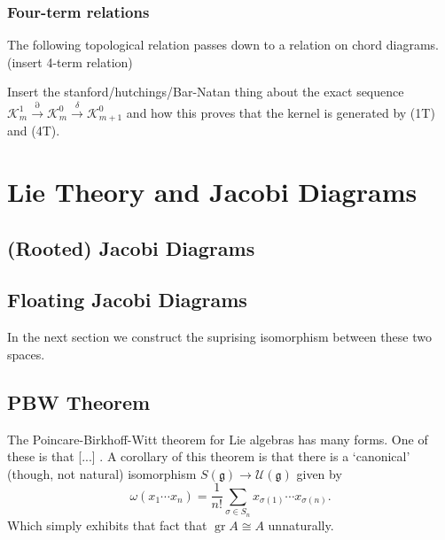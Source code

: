 \documentclass[12pt]{report}
\theoremstyle{regular}
\numberwithin{clause}{chapter}
\newcommand{\scaffold}[1]{
\begin{mdframed}[style=scaffold]
        {\color{teal}#1}
\end{mdframed}
}
\begin{document}
        \subsection{Four-term relations}

        \scaffold{The following topological relation passes down to a relation on chord diagrams. (insert 4-term relation)}

        \scaffold{Insert the stanford/hutchings/Bar-Natan thing about the exact sequence \(\mathcal{K}^{1}_{m} \xrightarrow{\partial} \mathcal{K}^{0}_{m} \xrightarrow{\delta} \mathcal{K}^{0}_{m + 1}\) and how this proves that the kernel is generated by (1T) and (4T).}


        \chapter{Lie Theory and Jacobi Diagrams}
        \label{ch:lie-theory-and-jacobi-diagrams}

        \section{(Rooted) Jacobi Diagrams}

        \section{Floating Jacobi Diagrams}

        \scaffold{In the next section we construct the suprising isomorphism between these two spaces.}

        \section{PBW Theorem}

        \scaffold{The Poincare-Birkhoff-Witt theorem for Lie algebras has many forms. One of these is that [...] . A corollary of this theorem \cite{enveloping-algebras} is that there is a `canonical' (though, not natural) isomorphism \(S(\mathfrak{g}) \to \mathcal{U}(\mathfrak{g})\) given by \[\omega(x_{1} \cdots x_{n}) = \frac{1}{n!} \sum_{\sigma \in S_{n}} x_{\sigma(1)} \cdots x_{\sigma(n)}.\] Which simply exhibits that fact that \(\operatorname{gr} A \cong A\) unnaturally.}
\end{document}
